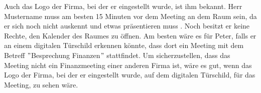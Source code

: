 Auch das Logo der Firma, bei der er eingestellt wurde, ist ihm bekannt.
Herr Mustername muss am besten 15 Minuten vor dem Meeting an dem Raum sein, da er sich noch nicht auskennt und etwas präsentieren muss .
Noch besitzt er keine Rechte, den Kalender des Raumes zu öffnen.
\newline
Am besten wäre es für Peter, falls er an einem digitalen Türschild erkennen könnte, dass dort ein Meeting mit dem Betreff \("\)Besprechung Finanzen\("\) stattfindet.
Um sicherzustellen, dass das Meeting nicht ein Finanzmeeting einer anderen Firma ist, wäre es gut, wenn das Logo der Firma, bei der er eingestellt wurde, auf dem digitalen Türschild, für das Meeting, zu sehen wäre.
\newline
\newline

